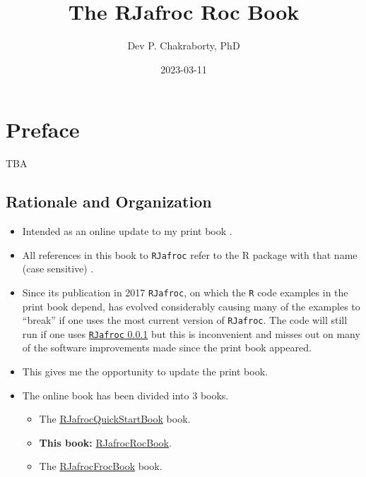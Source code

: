 \documentclass[
]{book}
\title{The RJafroc Roc Book}
\author{Dev P. Chakraborty, PhD}
\date{2023-03-11}
\providecommand{\tightlist}{%
  \setlength{\itemsep}{0pt}\setlength{\parskip}{0pt}}
\begin{document}
\maketitle

{
\setcounter{tocdepth}{1}
\tableofcontents
}
\hypertarget{preface}{%
\chapter*{Preface}\label{preface}}

TBA

\hypertarget{rationale-and-organization}{%
\section{Rationale and Organization}\label{rationale-and-organization}}

\begin{itemize}
\tightlist
\item
  Intended as an online update to my print book \citep{chakraborty2017observer}.
\item
  All references in this book to \texttt{RJafroc} refer to the R package with that name (case sensitive) \citep{R-RJafroc}.
\item
  Since its publication in 2017 \texttt{RJafroc}, on which the \texttt{R} code examples in the print book depend, has evolved considerably causing many of the examples to ``break'' if one uses the most current version of \texttt{RJafroc}. The code will still run if one uses \href{https://cran.r-project.org/src/contrib/Archive/RJafroc/}{\texttt{RJafroc} 0.0.1} but this is inconvenient and misses out on many of the software improvements made since the print book appeared.
\item
  This gives me the opportunity to update the print book.
\item
  The online book has been divided into 3 books.

  \begin{itemize}
  \tightlist
  \item
    The \href{https://dpc10ster.github.io/RJafrocQuickStart/}{RJafrocQuickStartBook} book.
  \item
    \textbf{This book:} \href{https://dpc10ster.github.io/RJafrocRocBook/}{RJafrocRocBook}.
  \item
    The \href{https://dpc10ster.github.io/RJafrocFrocBook/}{RJafrocFrocBook} book.
  \end{itemize}
\end{itemize}
\end{document}

